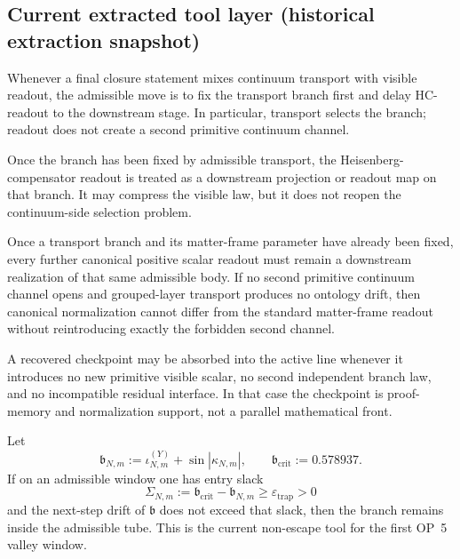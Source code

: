 \subsection*{Current extracted tool layer (historical extraction snapshot)}
\begin{description}[leftmargin=2.2em, labelindent=0pt, itemsep=0.5em]
 \item[Transport-first tool.] Whenever a final closure statement mixes continuum transport with visible readout, the admissible move is to fix the transport branch first and delay HC-readout to the downstream stage. In particular, transport selects the branch; readout does not create a second primitive continuum channel.
 \item[Readout-after-transport tool.] Once the branch has been fixed by admissible transport, the Heisenberg-compensator readout is treated as a downstream projection or readout map on that branch. It may compress the visible law, but it does not reopen the continuum-side selection problem.
 \item[Admissible-readout uniqueness tool.] Once a transport branch and its matter-frame parameter have already been fixed, every further canonical positive scalar readout must remain a downstream realization of that same admissible body. If no second primitive continuum channel opens and grouped-layer transport produces no ontology drift, then canonical normalization cannot differ from the standard matter-frame readout without reintroducing exactly the forbidden second channel.
 \item[Checkpoint-absorption tool.] A recovered checkpoint may be absorbed into the active line whenever it introduces no new primitive visible scalar, no second independent branch law, and no incompatible residual interface. In that case the checkpoint is proof-memory and normalization support, not a parallel mathematical front.
 \item[Epsilon-trap tool.] Let
 \[
 \mathfrak b_{N,m}:=\iota^{(Y)}_{N,m}+\sin|\kappa_{N,m}|,
 \qquad
 \mathfrak b_{\mathrm{crit}}:=0.578937.
 \]
 If on an admissible window one has entry slack
 \[
 \Sigma_{N,m}:=\mathfrak b_{\mathrm{crit}}-\mathfrak b_{N,m}\ge \varepsilon_{\mathrm{trap}}>0
 \]
 and the next-step drift of \(\mathfrak b\) does not exceed that slack, then the branch remains inside the admissible tube. This is the current non-escape tool for the first OP~5 valley window.


\end{description}
